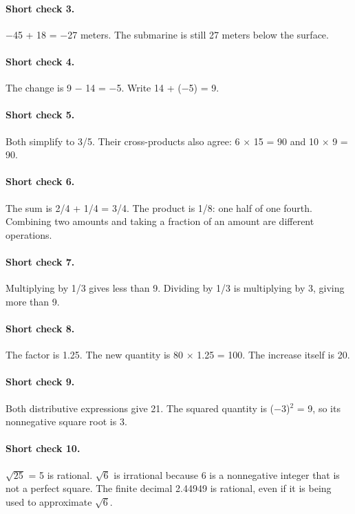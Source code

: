 \documentclass[12pt,letterpaper]{article}
\begin{document}
\paragraph{Short check 3.}
$-$45 + 18 = $-$27 meters. The submarine is still 27 meters below the surface.


\paragraph{Short check 4.}
The change is 9 $-$ 14 = $-$5. Write 14 + ($-$5) = 9.


\paragraph{Short check 5.}
Both simplify to 3/5. Their cross-products also agree: 6 $\times$ 15 = 90 and 10 $\times$ 9 = 90.


\paragraph{Short check 6.}
The sum is 2/4 + 1/4 = 3/4. The product is 1/8: one half of one fourth. Combining two amounts and taking a fraction of an amount are different operations.


\paragraph{Short check 7.}
Multiplying by 1/3 gives less than 9. Dividing by 1/3 is multiplying by 3, giving more than 9.


\paragraph{Short check 8.}
The factor is 1.25. The new quantity is 80 $\times$ 1.25 = 100. The increase itself is 20.


\paragraph{Short check 9.}
Both distributive expressions give 21. The squared quantity is ($-$3)$^2$ = 9, so its nonnegative square root is 3.


\paragraph{Short check 10.}
\(\sqrt{25}\) = 5 is rational. \(\sqrt{6}\) is irrational because 6 is a nonnegative integer that is not a perfect square. The finite decimal 2.44949 is rational, even if it is being used to approximate \(\sqrt{6}\).
\end{document}
